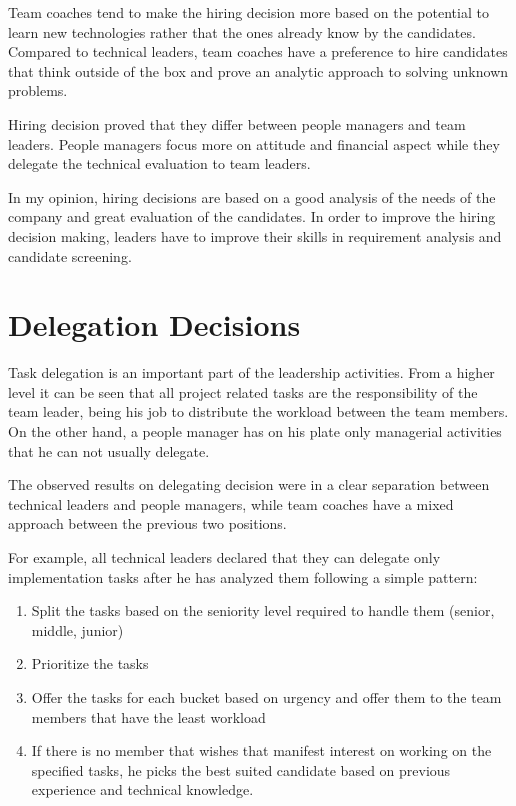 Team coaches tend to make the hiring decision more based on the potential to learn new technologies rather that the ones already know by the candidates. Compared to technical leaders, team coaches have a preference to hire candidates that think outside of the box and prove an analytic approach to solving unknown problems.

Hiring decision proved that they differ between people managers and team leaders. People managers focus more on attitude and financial aspect while they delegate the technical evaluation to team leaders. 

In my opinion, hiring decisions are based on a good analysis of the needs of the company and great evaluation of the candidates. In order to improve the hiring decision making, leaders have to improve their skills in requirement analysis and candidate screening.

\section{Delegation Decisions}
\label{sec:delegation}
Task delegation is an important part of the leadership activities. From a higher level it can be seen that all project related tasks are the responsibility of the team leader, being his job to distribute the workload between the team members. On the other hand, a people manager has on his plate only managerial activities that he can not usually delegate.

The observed results on delegating decision were in a clear separation between technical leaders and people managers, while team coaches have a mixed approach between the previous two positions.

For example, all technical leaders declared that they can delegate only implementation tasks after he has analyzed them following a simple pattern:
\begin{enumerate}
\item Split the tasks based on the seniority level required to handle them (senior, middle, junior)
\item Prioritize the tasks
\item Offer the tasks for each bucket based on urgency and offer them to the team members that have the least workload
\item If there is no member that wishes that manifest interest on working on the specified tasks, he picks the best suited candidate based on previous experience and technical knowledge.
\end{enumerate}

